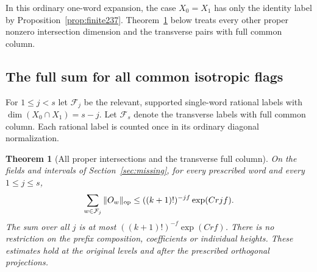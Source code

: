 \documentclass[a4paper,11pt]{article}
\newtheorem{theorem}[proposition]{Theorem}
\theoremstyle{definition}
\theoremstyle{remark}
\numberwithin{equation}{section}
\begin{document}
In this ordinary one-word expansion, the case \(X_0=X_1\)
has only the identity label by Proposition~\ref{prop:finite237}.
Theorem~\ref{thm:allflags298} below treats every other proper nonzero intersection dimension and the transverse pairs with full common column.

\subsection{The full sum for all common isotropic flags}\label{nav:IX-58}
For \(1\le j<s\) let \(\mathcal F_j\) be the relevant,
supported single-word rational labels with
\(\dim(X_0\cap X_1)=s-j\). Let \(\mathcal F_s\) denote
the transverse labels with full common column. Each rational
label is counted once in its ordinary diagonal normalization.

\begin{theorem}[All proper intersections and the transverse full column]\leavevmode
\label{thm:allflags298}
On the fields and intervals of Section~\ref{sec:missing}, for every
prescribed word and every \(1\le j\le s\),
\[
            \sum_{w\in\mathcal F_j}\|O_w\|_{\rm op}
                 \le ((k+1)!)^{-jf}\exp(Crjf).
\]
The sum over all \(j\) is at most
\(((k+1)!)^{-f}\exp(Crf)\). There is no restriction on
the prefix composition, coefficients or individual
heights. These estimates hold at the original levels and
after the prescribed orthogonal projections.
\end{theorem}
\end{document}
